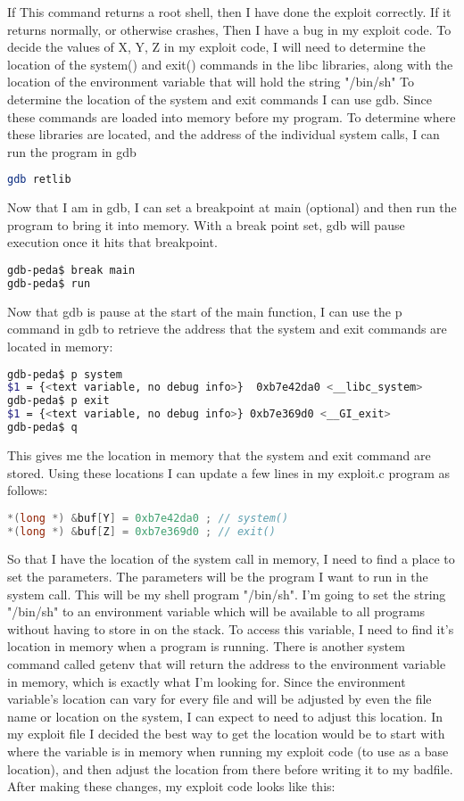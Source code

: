 \documentclass[14pt]{extarticle}
\begin{document}
If This command returns a root shell, then I have done the exploit correctly. If it returns normally, or otherwise crashes, Then I have a bug in my exploit code.
To decide the values of X, Y, Z in my exploit code, I will need to determine the location of the system() and exit() commands in the libc libraries, along with the location of the environment variable that will hold the string "/bin/sh"
To determine the location of the system and exit commands I can use gdb. Since these commands are loaded into memory before my program. To determine where these libraries are located, and the address of the individual system calls, I can run the program in gdb
\begin{lstlisting}[language=sh]
gdb retlib
\end{lstlisting}
Now that I am in gdb, I can set a breakpoint at main (optional) and then run the program to bring it into memory. With a break point set, gdb will pause execution once it hits that breakpoint\cite{seed-retlibc}.
\begin{lstlisting}[language=sh]
gdb-peda$ break main
gdb-peda$ run
\end{lstlisting}
Now that gdb is pause at the start of the main function, I can use the p command in gdb to retrieve the address that the system and exit commands are located in memory\cite{seed-retlibc}:
\begin{lstlisting}[language=sh]
gdb-peda$ p system
$1 = {<text variable, no debug info>}  0xb7e42da0 <__libc_system>
gdb-peda$ p exit
$1 = {<text variable, no debug info>} 0xb7e369d0 <__GI_exit>
gdb-peda$ q
\end{lstlisting}
This gives me the location in memory that the system and exit command are stored.
Using these locations I can update a few lines in my exploit.c program as follows:
\begin{lstlisting}[language=c]
*(long *) &buf[Y] = 0xb7e42da0 ; // system()
*(long *) &buf[Z] = 0xb7e369d0 ; // exit()
\end{lstlisting}
So that I have the location of the system call in memory, I need to find a place to set the parameters. The parameters will be the program I want to run in the system call. This will be my shell program "/bin/sh". I'm going to set the string "/bin/sh" to an environment variable which will be available to all programs without having to store in on the stack. To access this variable, I need to find it's location in memory when a program is running. There is another system command called getenv that will return the address to the environment variable in memory, which is exactly what I'm looking for. Since the environment variable's location can vary for every file and will be adjusted by even the file name or location on the system, I can expect to need to adjust this location\cite{seed-retlibc}. In my exploit file I decided the best way to get the location would be to start with where the variable is in memory when running my exploit code (to use as a base location), and then adjust the location from there before writing it to my badfile. After making these changes, my exploit code looks like this:
\end{document}
